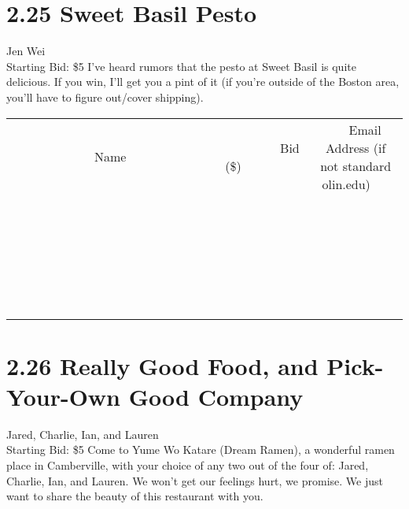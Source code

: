 \documentclass[11pt]{article}
\begin{document}
\section*{2.25 Sweet Basil Pesto}
Jen Wei
\\
Starting Bid: \$5
\newline
I've heard rumors that the pesto at Sweet Basil is quite delicious. If you win, I'll get you a pint of it (if you're outside of the Boston area, you'll have to figure out/cover shipping).
\\[6ex]
\begin{tabular}{c c c}
~~~~~~~~~~~~~Name~~~~~~~~~~~~~ & ~~~~~~~~~Bid (\$)~~~~~~~~~  & ~~~Email Address (if not standard olin.edu)~~~\\
 & & \\
\hline
 & & \\
\hline
 & & \\
\hline
 & & \\
\hline
 & & \\
\hline
 & & \\
\hline
 & & \\
\hline
 & & \\
\hline
 & & \\
\hline
 & & \\
\hline
 & & \\
\hline
 & & \\
\hline
 & & \\
\hline
 & & \\
\hline
 & & \\
\hline
 & & \\
\hline
 & & \\
\hline
 & & \\
\hline
 & & \\
\hline
 & & \\
\hline
 & & \\
\hline
 & & \\
\hline
 & & \\
\hline
 & & \\
\hline
 & & \\
\hline
 & & \\
\hline
\end{tabular}
\newpage
\section*{2.26 Really Good Food, and Pick-Your-Own Good Company}
Jared, Charlie, Ian, and Lauren
\\
Starting Bid: \$5
\newline
Come to Yume Wo Katare (Dream Ramen), a wonderful ramen place in Camberville, with your choice of any two out of the four of: Jared, Charlie, Ian, and Lauren. We won't get our feelings hurt, we promise. We just want to share the beauty of this restaurant with you. 
\end{document}
